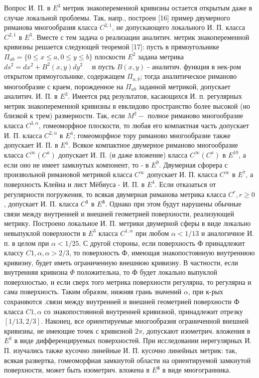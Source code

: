 \documentclass[10pt]{article}
\begin{document}
Вопрос И. П. в $E^{3}$ метрик знакопеременной кривизны остается открытым даже в случае локальной проблемы. Так, напр., построен [16] пример двумерного риманова многообразия класса $C^{2,1}$, не допускающего локального И. П. класса $C^{2,1}$ в $E^{3}$. Вместе с тем задача о реализации аналитич. метрик знакопеременной кривизны решается следующей теоремой [17]: пусть в прямоугольнике $\Pi_{a b}=\{0 \leqslant x \leqslant a, 0 \leqslant y \leqslant b\}$ плоскости $E^{2}$ задана метрика $d s^{2}=d x^{2}+B^{2}(x, y) d y^{2} \quad$ и пусть $B(x, y)$ - аналитич. функция в нек-ром открытом прямоугольнике, содержащем $\Pi_{a, b}$; тогда аналитическое риманово многообразие с краем, порожденное на $\Pi_{a b}$ заданной метрикой, допускает аналитич. И. П. в $E^{3}$. Имеется ряд результатов, касающихся И. п. регулярных метрик знакопеременной кривизны в евклидово пространство более высокой (но близкой к трем) размерности. Так, если $M^{2}-$ полное риманово многообразие класса $C^{3, \alpha}$, гомеоморфное плоскости, то любая его компактная часть допускает И. П. класса $C^{2, \alpha}$ в $E^{4}$; гомеоморфное тору риманово многообразие также допускает И. П. в $E^{4}$. Всякое компактное двумерное риманово многообразие класса $C^{\infty}\left(C^{a}\right)$ допускает И. П. (и даже вложение) класса $C^{\infty}\left(C^{a}\right)$ в $E^{10}$, а если оно не имеет замкнутых компонент, то - в $E^{9}$. Двумерная сфорера с произвольной римановой метрикой класса $C^{\infty}$ допускает И. П. класса $C^{\infty}$ в $E^{7}$, а поверхность Клейна и лист Мёбиуса - И. П. в $E^{4}$. Если отказаться от регулярности погружения, то всякая двумерная риманова метрика класса $C^{r}, r \geqslant 0$, допускает И. П. класса $C^{\mathbf{1}}$ в $E^{\mathbf{3}}$. Однако при этом будут нарушены обычные связи между внутренней и внешней геометрией поверхности, реализующей метрику. Построено локальное И. П. метрики двумерной сферы в виде локально невыпуклой поверхности в $E^{3}$ класса $C^{1, \alpha}$ при любом $\alpha<1 / 13$ и аналогичное И. п. в целом при $\alpha<1 / 25$. С другой стороны, если поверхность Ф принадлежит классу $C 1, \alpha, \alpha>2 / 3$, то поверхность Ф, имеющая знакопостоянную внутреннюю кривизну, будет иметь ограниченную внешнюю кривизну. В частности, если внутренняя кривизна $\Phi$ положительна, то Ф будет локально выпуклой поверхностью, и если сверх того метрика поверхности регулярна, то регулярна и сама поверхность. Таким образом, нижняя грань значений $\alpha$, при к-рых сохраняются .связи между внутренней и внешней геометрией поверхности Ф класса $C 1, \alpha$ со знакопостоянной внутренней кривизной, принадлежит отрезку $[1 / 13,2 / 3]$. Наконец, все ориентируемые многообразия ограниченной внешней кривизны, не имеющие точек с кривизной $2 \pi$, допускают изометрич. вложения в $E^{3}$ в виде дифференцируемых поверхностей. При исследовании нерегулярных И. П. изучались также кусочно линейные И. П. кусочно линейных метрик: так, всякая развертка, гомеоморфиая замкнутой области на ориентируемой замкнутой поверхности, может быть изометрич. вложена в $E^{\mathbf{3}}$ в виде многогранника.
\end{document}
